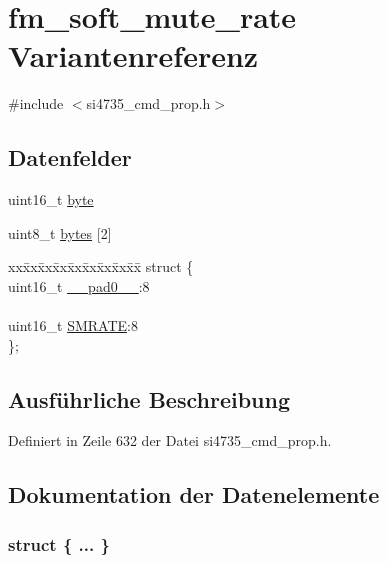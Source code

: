 \hypertarget{unionfm__soft__mute__rate}{}\section{fm\+\_\+soft\+\_\+mute\+\_\+rate Variantenreferenz}
\label{unionfm__soft__mute__rate}


{\ttfamily \#include $<$si4735\+\_\+cmd\+\_\+prop.\+h$>$}

\subsection*{Datenfelder}
\begin{DoxyCompactItemize}
\item 
uint16\+\_\+t \hyperlink{unionfm__soft__mute__rate_ab0549c1b5ea980a02e7eab77e21fea49}{byte}
\item 
uint8\+\_\+t \hyperlink{unionfm__soft__mute__rate_a46e4c05d20a047ec169f60d3167e912e}{bytes} \mbox{[}2\mbox{]}
\item 
\begin{tabbing}
xx\=xx\=xx\=xx\=xx\=xx\=xx\=xx\=xx\=\kill
struct \{\\
\>uint16\_t \hyperlink{unionfm__soft__mute__rate_a77132c2c26a75f5b8751b235cda23828}{\_\_pad0\_\_}:8\\
\>\\
\>uint16\_t \hyperlink{unionfm__soft__mute__rate_aee04360e3c9299f145d4143333baaf9a}{SMRATE}:8\\
\}; \\

\end{tabbing}\end{DoxyCompactItemize}


\subsection{Ausführliche Beschreibung}


Definiert in Zeile 632 der Datei si4735\+\_\+cmd\+\_\+prop.\+h.



\subsection{Dokumentation der Datenelemente}
\hypertarget{unionfm__soft__mute__rate_adb99ea58d676410b2e1be5ffa5472caf}{}\subsubsection[{"@73}]{\setlength{\rightskip}{0pt plus 5cm}struct \{ ... \} }\label{unionfm__soft__mute__rate_adb99ea58d676410b2e1be5ffa5472caf}
\hypertarget{unionfm__soft__mute__rate_a77132c2c26a75f5b8751b235cda23828}{}
